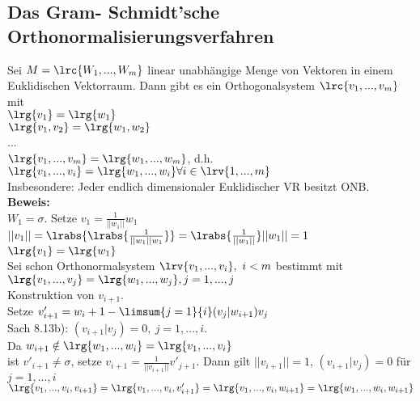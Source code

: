 \subsection{Das Gram- Schmidt'sche Orthonormalisierungsverfahren}
	Sei $ M=\lrc{W_1,...,W_m} $ linear unabhängige Menge von Vektoren in einem Euklidischen Vektorraum. Dann gibt es ein Orthogonalsystem $ \lrc{v_1,...,v_m} $ mit\\
	$ \lrg{v_1}=\lrg{w_1} $\\
	$ \lrg{v_1,v_2}=\lrg{w_1,w_2} $\\
	...\\
	$ \lrg{v_1,...,v_m}=\lrg{w_1,...,w_m} $, d.h.\\
	$ \lrg{v_1,...,v_i}=\lrg{w_1,...,w_i}\forall i\in\lrv{1,...,m} $\\
	Insbesondere: Jeder endlich dimensionaler Euklidischer VR besitzt ONB.\\
	\textbf{Beweis:}\\
	$ W_1=\sigma $. Setze $ v_1=\frac{1}{||w_1||}w_1 $\\
	$ ||v_1||=\lrabs{\lrabs{\frac{1}{||w_1||w_1}}}=\lrabs{\frac{1}{||w_1||}}||w_1||=1 $\\
	$ \lrg{v_1}=\lrg{w_1} $\\
	Sei schon Orthonormalsystem $ \lrv{v_1,...,v_i},\ i<m $ bestimmt mit $ \lrg{v_1,...,v_j}=\lrg{w_1,...,w_j},j=1,...,j $\\
	Konstruktion von $ v_{i+1} $.\\
	Setze $ v'_{i+1}=w_i+1-\limsum{j=1}{i}(v_j|w_{i+1})v_j $\\
	Sach 8.13b): $ (v_{i+1}|v_j)=0,\ j=1,...,i $.\\
	Da $ w_{i+1}\notin\lrg{w_1,...,w_i}=\lrg{v_1,...,v_i} $\\
	ist $ v'_{i+1}\neq\sigma $, setze $ v_{i+1}=\frac{1}{||v_{i+1}||}v'_{j+1} $. Dann gilt $ ||v_{i+1}||=1 $, $ (v_{i+1}|v_j)=0 $ für $ j=1,...,i $\\
	$ \lrg{v_1,...,v_i,v_{i+1}}=\lrg{v_1,...,v_i,v'_{i+1}}=\lrg{v_1,...,v_i,w_{i+1}}=\lrg{w_1,...,w_i,w_{i+1}} $

